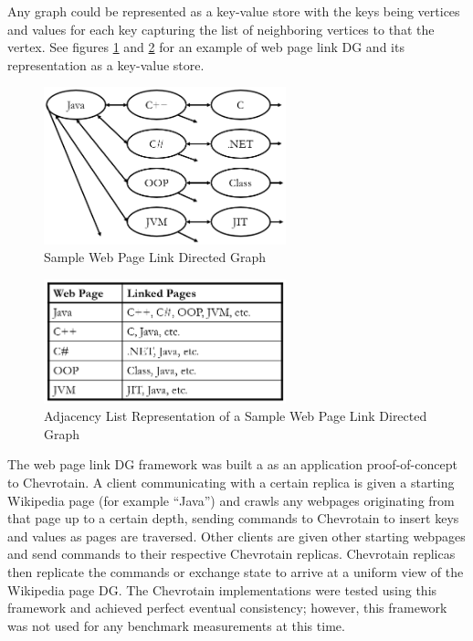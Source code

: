 \documentclass[sigconf,nonacm,10pt]{acmart}
\begin{document}
Any graph could be represented as a key-value store with the keys being vertices and values for each key capturing the list of neighboring vertices to that the vertex. See figures \ref{fig:wiki1} and \ref{fig:wiki2} for an example of web page link DG and its representation as a key-value store.

\begin{figure}[h]
  \centering
  \includegraphics[width=7cm]{Fig11Wiki1}
  \caption{Sample Web Page Link Directed Graph}
  \label{fig:wiki1}
\end{figure}

\begin{figure}[h]
  \centering
  \includegraphics[width=7cm]{Fig12Wiki2}
  \caption{Adjacency List Representation of a Sample Web Page Link Directed Graph}
  \label{fig:wiki2}
\end{figure}

The web page link DG framework was built a as an application proof-of-concept to Chevrotain. A client communicating with a certain replica is given a starting Wikipedia page (for example ``Java'') and crawls any webpages originating from that page up to a certain depth, sending commands to Chevrotain to insert keys and values as pages are traversed. Other clients are given other starting webpages and send commands to their respective Chevrotain replicas. Chevrotain replicas then replicate the commands or exchange state to arrive at a uniform view of the Wikipedia page DG. The Chevrotain implementations were tested using this framework and achieved perfect eventual consistency; however, this framework was not used for any benchmark measurements at this time.
\end{document}
